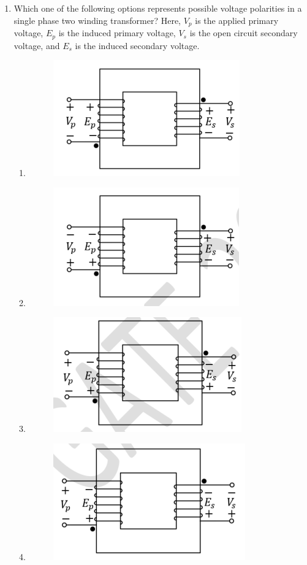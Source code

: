 \documentclass[journal,12pt,onecolumn]{IEEEtran}
\theoremstyle{remark}
\begin{document}
\begin{enumerate}[start=1, label=Q.\arabic*]
    \item Which one of the following options represents possible voltage polarities in a single phase two winding transformer? Here, $V_p$ is the applied primary voltage, $E_p$ is the induced primary voltage, $V_s$ is the open circuit secondary voltage, and $E_s$ is the induced secondary voltage.
    \begin{enumerate}
        \item \begin{figure}[H]
        \centering
        \includegraphics[width=0.4\columnwidth]{Figures/q18a.png}
        \caption{}
    \end{figure}
    \item \begin{figure}[H]
        \centering
        \includegraphics[width=0.4\columnwidth]{Figures/q18b.png}
        \caption{}
    \end{figure}
    \item \begin{figure}[H]
        \centering
        \includegraphics[width=0.4\columnwidth]{Figures/q18c.png}
        \caption{}
    \end{figure}
    \item \begin{figure}[H]
        \centering
        \includegraphics[width=0.4\columnwidth]{Figures/q18d.png}
        \caption{}
    \end{figure}
    \end{enumerate}


\end{enumerate}
\end{document}

